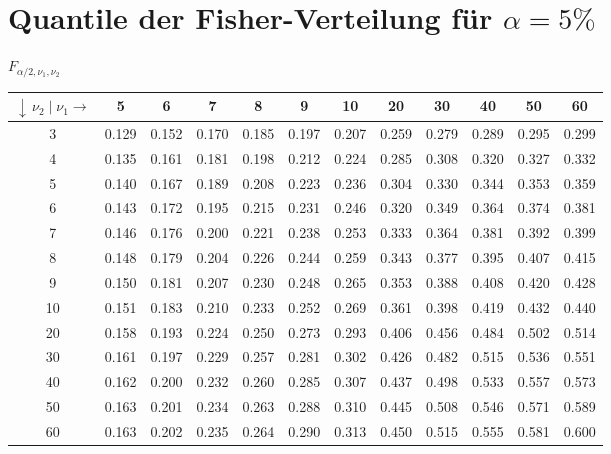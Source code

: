 \pagebreak


\section{Quantile der Fisher-Verteilung für $\alpha = 5 \%$}


$F_{\alpha/2,\nu_1, \nu_2}$

\vspace{1mm}

\begin{footnotesize}

\begin{tabular}{|c||c|c|c|c|c|c|c|c|c|c|c|}
\hline
 $\downarrow \, \nu_2 \; | \; \nu_1 \rightarrow$  & 5 & 6 & 7 & 8 & 9 & 10 & 20 & 30 & 40 & 50 & 60 \\
\hline\hline
3 & 0.129 & 0.152 & 0.170 & 0.185 & 0.197 & 0.207 & 0.259 & 0.279 & 0.289 & 0.295 & 0.299\\
\hline
4 & 0.135 & 0.161 & 0.181 & 0.198 & 0.212 & 0.224 & 0.285 & 0.308 & 0.320 & 0.327 & 0.332\\
\hline
 5 & 0.140 & 0.167 & 0.189 & 0.208 & 0.223 & 0.236 & 0.304 & 0.330 & 0.344 & 0.353 & 0.359 \\
\hline
 6 & 0.143 & 0.172 & 0.195 & 0.215 & 0.231 & 0.246 & 0.320 & 0.349 & 0.364 & 0.374 & 0.381 \\
\hline
 7 & 0.146 & 0.176 & 0.200 & 0.221 & 0.238 & 0.253 & 0.333 & 0.364 & 0.381 & 0.392 & 0.399 \\
\hline
 8 & 0.148 & 0.179 & 0.204 & 0.226 & 0.244 & 0.259 & 0.343 & 0.377 & 0.395 & 0.407 & 0.415 \\
\hline
 9 & 0.150 & 0.181 & 0.207 & 0.230 & 0.248 & 0.265 & 0.353 & 0.388 & 0.408 & 0.420 & 0.428 \\
\hline
 10 & 0.151 & 0.183 & 0.210 & 0.233 & 0.252 & 0.269 & 0.361 & 0.398 & 0.419 & 0.432 & 0.440 \\
\hline
 20 & 0.158 & 0.193 & 0.224 & 0.250 & 0.273 & 0.293 & 0.406 & 0.456 & 0.484 & 0.502 & 0.514 \\
\hline
 30 & 0.161 & 0.197 & 0.229 & 0.257 & 0.281 & 0.302 & 0.426 & 0.482 & 0.515 & 0.536 & 0.551 \\
\hline
 40 & 0.162 & 0.200 & 0.232 & 0.260 & 0.285 & 0.307 & 0.437 & 0.498 & 0.533 & 0.557 & 0.573 \\
\hline
 50 & 0.163 & 0.201 & 0.234 & 0.263 & 0.288 & 0.310 & 0.445 & 0.508 & 0.546 & 0.571 & 0.589 \\
\hline
 60 & 0.163 & 0.202 & 0.235 & 0.264 & 0.290 & 0.313 & 0.450 & 0.515 & 0.555 & 0.581 & 0.600 \\
\hline
\end{tabular}
\end{footnotesize}

